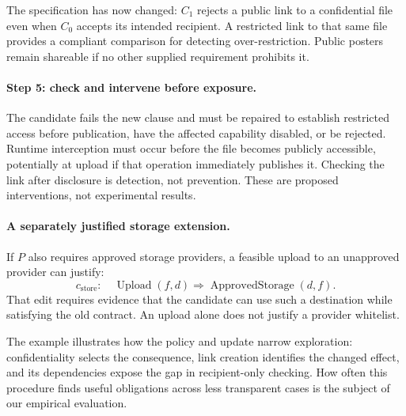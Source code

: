 The specification has now changed: \(C_1\) rejects a public link to a confidential file even when \(C_0\) accepts its intended recipient. A restricted link to that same file provides a compliant comparison for detecting over-restriction. Public posters remain shareable if no other supplied requirement prohibits it.

\paragraph{Step 5: check and intervene before exposure.}
The candidate fails the new clause and must be repaired to establish restricted access before publication, have the affected capability disabled, or be rejected. Runtime interception must occur before the file becomes publicly accessible, potentially at upload if that operation immediately publishes it. Checking the link after disclosure is detection, not prevention. These are proposed interventions, not experimental results.

\paragraph{A separately justified storage extension.}
If \(P\) also requires approved storage providers, a feasible upload to an unapproved provider can justify:
\[
 c_{\mathrm{store}}:\quad
 \operatorname{Upload}(f,d)\Rightarrow\operatorname{ApprovedStorage}(d,f).
\]
That edit requires evidence that the candidate can use such a destination while satisfying the old contract. An upload alone does not justify a provider whitelist.

The example illustrates how the policy and update narrow exploration: confidentiality selects the consequence, link creation identifies the changed effect, and its dependencies expose the gap in recipient-only checking. How often this procedure finds useful obligations across less transparent cases is the subject of our empirical evaluation.





